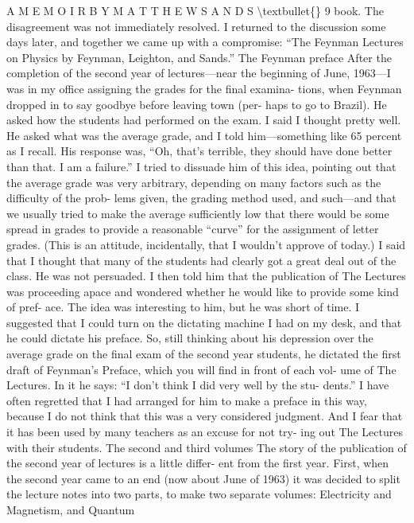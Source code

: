\documentclass[10pt,oneside]{article}
\begin{document}
A  M E M O I R  B Y  M A T T H E W  S A N D S \textbackslash{}textbullet\{\} 9 book. The disagreement was not immediately resolved. I returned to the discussion some days later, and together we came up with a compromise: “The Feynman Lectures on Physics by Feynman, Leighton, and Sands.” The Feynman preface After the completion of the second year of lectures---near the beginning of June, 1963---I was in my office assigning the grades for the final examina- tions, when Feynman dropped in to say goodbye before leaving town (per- haps to go to Brazil). He asked how the students had performed on the exam. I said I thought pretty well. He asked what was the average grade, and I told him---something like 65 percent as I recall. His response was, “Oh, that’s terrible, they should have done better than that. I am a failure.” I tried to dissuade him of this idea, pointing out that the average grade was very arbitrary, depending on many factors such as the difficulty of the prob- lems given, the grading method used, and such---and that we usually tried to make the average sufficiently low that there would be some spread in grades to provide a reasonable “curve” for the assignment of letter grades. (This is an attitude, incidentally, that I wouldn’t approve of today.) I said that I thought that many of the students had clearly got a great deal out of the class. He was not persuaded. I then told him that the publication of The Lectures was proceeding apace and wondered whether he would like to provide some kind of pref- ace. The idea was interesting to him, but he was short of time. I suggested that I could turn on the dictating machine I had on my desk, and that he could dictate his preface. So, still thinking about his depression over the average grade on the final exam of the second year students, he dictated the first draft of Feynman’s Preface, which you will find in front of each vol- ume of The Lectures. In it he says: “I don’t think I did very well by the stu- dents.” I have often regretted that I had arranged for him to make a preface in this way, because I do not think that this was a very considered judgment. And I fear that it has been used by many teachers as an excuse for not try- ing out The Lectures with their students. The second and third volumes The story of the publication of the second year of lectures is a little differ- ent from the first year. First, when the second year came to an end (now about June of 1963) it was decided to split the lecture notes into two parts, to make two separate volumes: Electricity and Magnetism, and Quantum\par
\end{document}
